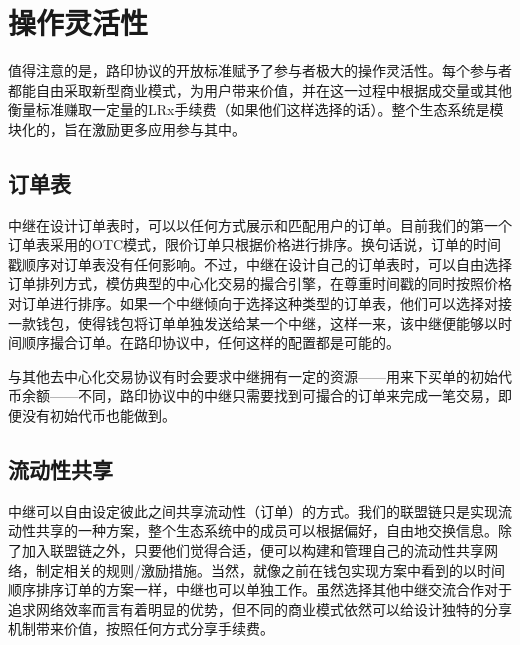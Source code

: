 \documentclass[UTF8]{ctexart}
\makeatletter
\newenvironment{figurehere}
 {\def\@captype{figure}}
 {}
\makeatother
\begin{document}
\begin{multicols}{2}
\begin{enumerate}
\end{enumerate}





%
%
%

\section{操作灵活性\label{sec:business_model}}
值得注意的是，路印协议的开放标准赋予了参与者极大的操作灵活性。每个参与者都能自由采取新型商业模式，为用户带来价值，并在这一过程中根据成交量或其他衡量标准赚取一定量的LRx手续费（如果他们这样选择的话）。整个生态系统是模块化的，旨在激励更多应用参与其中。

\subsection{订单表\label{sec:order_book}}
中继在设计订单表时，可以以任何方式展示和匹配用户的订单。目前我们的第一个订单表采用的OTC模式，限价订单只根据价格进行排序。换句话说，订单的时间戳顺序对订单表没有任何影响。不过，中继在设计自己的订单表时，可以自由选择订单排列方式，模仿典型的中心化交易的撮合引擎，在尊重时间戳的同时按照价格对订单进行排序。如果一个中继倾向于选择这种类型的订单表，他们可以选择对接一款钱包，使得钱包将订单单独发送给某一个中继，这样一来，该中继便能够以时间顺序撮合订单。在路印协议中，任何这样的配置都是可能的。

与其他去中心化交易协议有时会要求中继拥有一定的资源——用来下买单的初始代币余额——不同，路印协议中的中继只需要找到可撮合的订单来完成一笔交易，即便没有初始代币也能做到。

\subsection{流动性共享\label{sec:liquidity_sharing}}
中继可以自由设定彼此之间共享流动性（订单）的方式。我们的联盟链只是实现流动性共享的一种方案，整个生态系统中的成员可以根据偏好，自由地交换信息。除了加入联盟链之外，只要他们觉得合适，便可以构建和管理自己的流动性共享网络，制定相关的规则/激励措施。当然，就像之前在钱包实现方案中看到的以时间顺序排序订单的方案一样，中继也可以单独工作。虽然选择其他中继交流合作对于追求网络效率而言有着明显的优势，但不同的商业模式依然可以给设计独特的分享机制带来价值，按照任何方式分享手续费。 



\end{multicols}
\end{document}
